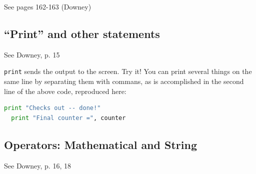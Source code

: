 \documentclass[a4paper,10pt]{scrartcl}
\begin{document}
\begin{framed}
 See pages 162-163 (Downey)
\end{framed}

\subsection{``Print'' and other statements}

\begin{framed}
See Downey, p. 15
\end{framed}

\lstinline{print} sends the output to the screen. Try it! You can print several things on the same line by separating them with commans, as is accomplished in the second line of the above code, reproduced here:
\begin{lstlisting}[belowskip=-1.6\baselineskip, language=python]
  print "Checks out -- done!"
  print "Final counter =", counter
\end{lstlisting}
  
\subsection{Operators: Mathematical and String}
\label{s:math}

\begin{framed}
See Downey, p. 16, 18
\end{framed}
\end{document}
